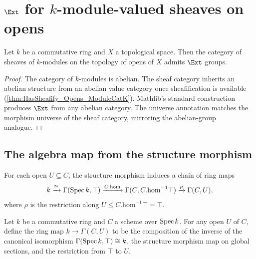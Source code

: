 \section{\(\Ext\) for \(k\)-module-valued sheaves on opens}
\label{sec:moduleK_ext}

\begin{theorem}
  \label{thm:HasExt_Sheaf_Opens_ModuleCatK}

  Let \(k\) be a commutative ring and \(X\) a topological space. Then the category of sheaves of \(k\)-modules on the topology of opens of \(X\) admits \(\Ext\) groups.
\end{theorem}

\begin{proof}

\leanok
  The category of \(k\)-modules is abelian. The sheaf category inherits an abelian structure from an abelian value category once sheafification is available (\cref{thm:HasSheafify_Opens_ModuleCatK}). Mathlib's standard construction produces \(\Ext\) from any abelian category. The universe annotation matches the morphism universe of the sheaf category, mirroring the abelian-group analogue.
\end{proof}

\subsection{The algebra map from the structure morphism}

For each open \(U \subseteq C\), the structure morphism induces a chain of ring maps
\[
  k \xrightarrow{\cong} \Gamma(\operatorname{Spec} k, \top) \xrightarrow{C.\mathrm{hom}} \Gamma(C, C.\mathrm{hom}^{-1}\top) \xrightarrow{\rho} \Gamma(C, U),
\]
where \(\rho\) is the restriction along \(U \le C.\mathrm{hom}^{-1}\top = \top\).

\begin{definition}
  \label{def:Scheme_kToSection}
  
  Let \(k\) be a commutative ring and \(C\) a scheme over \(\operatorname{Spec} k\). For any open \(U\) of \(C\), define the ring map \(k \to \Gamma(C, U)\) to be the composition of the inverse of the canonical isomorphism \(\Gamma(\operatorname{Spec} k, \top) \cong k\), the structure morphism map on global sections, and the restriction from \(\top\) to \(U\).
\end{definition}

